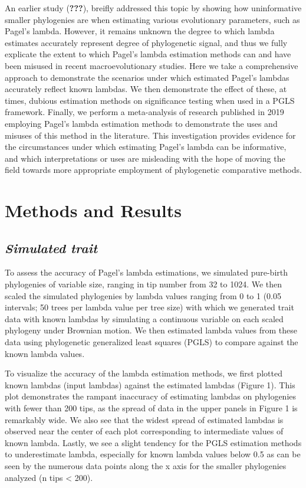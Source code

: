 \documentclass[]{article}
\begin{document}
An earlier study ({\textbf{???}}), breifly addressed this topic by
showing how uninformative smaller phylogenies are when estimating
various evolutionary parameters, such as Pagel's lambda. However, it
remains unknown the degree to which lambda estimates accurately
represent degree of phylogenetic signal, and thus we fully explicate the
extent to which Pagel's lambda estimation methods can and have been
misused in recent macroevolutionary studies. Here we take a
comprehensive approach to demonstrate the scenarios under which
estimated Pagel's lambdas accurately reflect known lambdas. We then
demonstrate the effect of these, at times, dubious estimation methods on
significance testing when used in a PGLS framework. Finally, we perform
a meta-analysis of research published in 2019 employing Pagel's lambda
estimation methods to demonstrate the uses and misuses of this method in
the literature. This investigation provides evidence for the
circumstances under which estimating Pagel's lambda can be informative,
and which interpretations or uses are misleading with the hope of moving
the field towards more appropriate employment of phylogenetic
comparative methods.

\section{Methods and Results}\label{methods-and-results}

\subsection{\texorpdfstring{\emph{Simulated
trait}}{Simulated trait}}\label{simulated-trait}

To assess the accuracy of Pagel's lambda estimations, we simulated
pure-birth phylogenies of variable size, ranging in tip number from 32
to 1024. We then scaled the simulated phylogenies by lambda values
ranging from 0 to 1 (0.05 intervals; 50 trees per lambda value per tree
size) with which we generated trait data with known lambdas by
simulating a continuous variable on each scaled phylogeny under Brownian
motion. We then estimated lambda values from these data using
phylogenetic generalized least squares (PGLS) to compare against the
known lambda values. \hfill\break

To visualize the accuracy of the lambda estimation methods, we first
plotted known lambdas (input lambdas) against the estimated lambdas
(Figure 1). This plot demonstrates the rampant inaccuracy of estimating
lambdas on phylogenies with fewer than 200 tips, as the spread of data
in the upper panels in Figure 1 is remarkably wide. We also see that the
widest spread of estimated lambdas is observed near the center of each
plot corresponding to intermediate values of known lambda. Lastly, we
see a slight tendency for the PGLS estimation methods to underestimate
lambda, especially for known lambda values below 0.5 as can be seen by
the numerous data points along the x axis for the smaller phylogenies
analyzed (n tips \textless{} 200). \hfill\break
\end{document}
